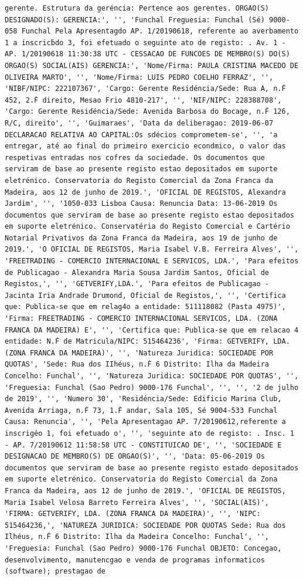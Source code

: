 \documentclass[
  12pt,
]{article}
\begin{document}
\begin{verbatim}
gerente. Estrutura da geréncia: Pertence aos gerentes. ORGAO(S) DESIGNADO(S): GERENCIA:', '', 'Funchal Freguesia: Funchal (Sé) 9000-058 Funchal Pela Apresentagdo AP. 1/20190618, referente ao averbamento 1 a inscricḃdo 3, foi efetuado o seguinte ato de registo: . Av. 1 - AP. 1/20190618 11:30:38 UTC - CESSACAO DE FUNCOES DE MEMBRO(S) DO(S) ORGAO(S) SOCIAL(AIS) GERENCIA:', 'Nome/Firma: PAULA CRISTINA MACEDO DE OLIVEIRA MARTO', '', 'Nome/Firma: LUIS PEDRO COELHO FERRAZ', '', 'NIBF/NIPC: 222107367', 'Cargo: Gerente Residéncia/Sede: Rua A, n.Ḟ 452, 2.Ḟ direito, Mesao Frio 4810-217', '', 'NIF/NIPC: 228388708', 'Cargo: Gerente Residéncia/Sede: Avenida Barbosa do Bocage, n.Ḟ 126, R/C, direito', '', 'Guimaraes', 'Data da deliberagao: 2019-06-07 DECLARACAO RELATIVA AO CAPITAL:Os sdécios comprometem-se', '', 'a entregar, até ao final do primeiro exercicio econdmico, o valor das respetivas entradas nos cofres da sociedade. Os documentos que serviram de base ao presente registo estao depositados em suporte eletrénico. Conservatoria do Registo Comercial da Zona Franca da Madeira, aos 12 de junho de 2019.', 'OFICIAL DE REGISTOS, Alexandra Jardim', '', '1050-033 Lisboa Causa: Renuncia Data: 13-06-2019 Os documentos que serviram de base ao presente registo estao depositados em suporte eletrénico. Conservatéria do Registo Comercial e Cartério Notarial Privativos da Zona Franca da Madeira, aos 19 de junho de 2019.', 'O OFICIAL DE REGISTOS, Maria Isabel V.B. Ferreira Alves', '', 'FREETRADING - COMERCIO INTERNACIONAL E SERVICOS, LDA.', 'Para efeitos de Publicagao - Alexandra Maria Sousa Jardim Santos, Oficial de Registos,', '', 'GETVERIFY,LDA.', 'Para efeitos de Publicagao - Jacinta Iria Andrade Drumond, Oficial de Registos,', '', 'Certifica que: Publica-se que em relag4o a entidade: 511118082 (Pasta 4975)', 'Firma: FREETRADING - COMERCIO INTERNACIONAL SERVICOS, LDA. (ZONA FRANCA DA MADEIRA) E', '', 'Certifica que: Publica-se que em relacao 4 entidade: N.Ḟ de Matricula/NIPC: 515464236', 'Firma: GETVERIFY, LDA. (ZONA FRANCA DA MADEIRA)', '', 'Natureza Juridica: SOCIEDADE POR QUOTAS', 'Sede: Rua dos IIhéus, n.Ḟ 6 Distrito: Ilha da Madeira Concelho: Funchal', '', 'Natureza Juridica: SOCIEDADE POR QUOTAS', '', 'Freguesia: Funchal (Sao Pedro) 9000-176 Funchal', '', '', '2 de julho de 2019', '', 'Numero 30', 'Residéncia/Sede: Edificio Marina Club, Avenida Arriaga, n.Ḟ 73, 1.Ḟ andar, Sala 105, Sé 9004-533 Funchal Causa: Renuncia', '', 'Pela Apresentagao AP. 7/20190612,referente a inscrigéo 1, foi efetuado o', '', 'seguinte ato de registo: . Insc. 1 - AP. 7/20190612 11:58:58 UTC - CONSTITUICAO DE', '', 'SOCIEDADE E DESIGNACAO DE MEMBRO(S) DE ORGAO(S)', '', 'Data: 05-06-2019 Os documentos que serviram de base ao presente registo estado depositados em suporte eletrénico. Conservatoria do Registo Comercial da Zona Franca da Madeira, aos 12 de junho de 2019.', 'OFICIAL DE REGISTOS, Maria Isabel Velosa Barreto Ferreira Alves', '', 'SOCIAL(AIS)', 'FIRMA: GETVERIFY, LDA. (ZONA FRANCA DA MADEIRA)', '', 'NIPC: 515464236,', 'NATUREZA JURIDICA: SOCIEDADE POR QUOTAS Sede: Rua dos Ilhéus, n.Ḟ 6 Distrito: Ilha da Madeira Concelho: Funchal', '', 'Freguesia: Funchal (Sao Pedro) 9000-176 Funchal OBJETO: Concegao, desenvolvimento, manutencgao e venda de programas informaticos (software); prestagao de 
\end{verbatim}
\end{document}
